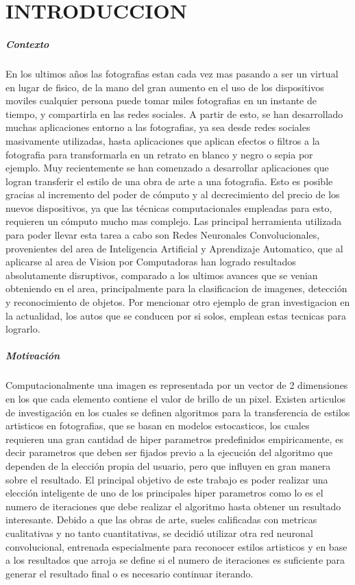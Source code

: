 \documentclass[a4paper,12pt,spanish]{book}
\begin{document}
\tableofcontents 

\chapter{INTRODUCCION}
  \paragraph{Contexto}
  En los ultimos años las fotografias estan cada vez mas pasando a ser un virtual en lugar de fisico, de la mano del gran aumento en el uso de los dispositivos moviles 
  cualquier persona puede tomar miles fotografias en un instante de tiempo, y compartirla en las redes sociales.
  A partir de esto, se han desarrollado muchas aplicaciones entorno a las fotografias, ya sea desde redes sociales masivamente utilizadas, hasta aplicaciones que aplican efectos o filtros 
  a la fotografia para transformarla en un retrato en blanco y negro o sepia por ejemplo.
  Muy recientemente se han comenzado a desarrollar aplicaciones que logran transferir el estilo de una obra de arte a una fotografia. Esto es posible gracias al incremento 
  del poder de cómputo y al decrecimiento del precio de los nuevos dispositivos, ya que las técnicas computacionales empleadas para esto, requieren un cómputo mucho mas complejo.
  Las principal herramienta utilizada para poder llevar esta tarea a cabo son Redes Neuronales Convolucionales, provenientes del area de  
  Inteligencia Artificial y Aprendizaje Automatico, que al aplicarse al area de Vision por Computadoras han logrado resultados absolutamente disruptivos, 
  comparado a los ultimos avances que se venian obteniendo en el area, principalmente para la clasificacion de imagenes, detección y reconocimiento de objetos.
  Por mencionar otro ejemplo de gran investigacion en la actualidad, los autos que se conducen por si solos, emplean estas tecnicas para lograrlo.
  \paragraph{Motivación}
  Computacionalmente una imagen es representada por un vector de 2 dimensiones en los que cada elemento contiene el valor de brillo de un pixel.
  Existen articulos de investigación en los cuales se definen algoritmos para la transferencia de estilos artisticos en fotografias, que se basan en modelos estocasticos, 
  los cuales requieren una gran cantidad de hiper parametros predefinidos empiricamente, es decir parametros que deben ser fijados previo a la ejecución del algoritmo que dependen 
  de la elección propia del usuario, pero que influyen en gran manera sobre el resultado.
  El principal objetivo de este trabajo es poder realizar una elección inteligente de uno de los principales hiper parametros como lo es el numero de iteraciones 
  que debe realizar el algoritmo hasta obtener un resultado interesante.
  Debido a que las obras de arte, sueles calificadas con metricas cualitativas y no tanto cuantitativas, se decidió utilizar otra red neuronal convolucional, 
  entrenada especialmente para reconocer estilos artisticos y en base a los resultados que arroja se define si el numero de iteraciones es suficiente para generar el resultado final 
  o es necesario continuar iterando.
\end{document}
